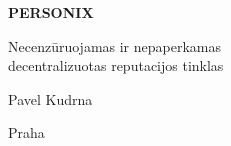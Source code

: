 \thispagestyle{empty}
\begin{center}
  {\sffamily\bfseries\fontsize{34}{40}\selectfont PERSONIX\par}
  \vspace{2.2em}
  {\rmfamily\large Necenzūruojamas ir nepaperkamas\\[0.25em]
   decentralizuotas reputacijos tinklas\par}
\end{center}
\begin{center}
  {\rmfamily\Large Pavel Kudrna\par}
  \vspace{0.45em}
  {\rmfamily\small Praha\quad\textbullet{}\par}
\end{center}
\clearpage
